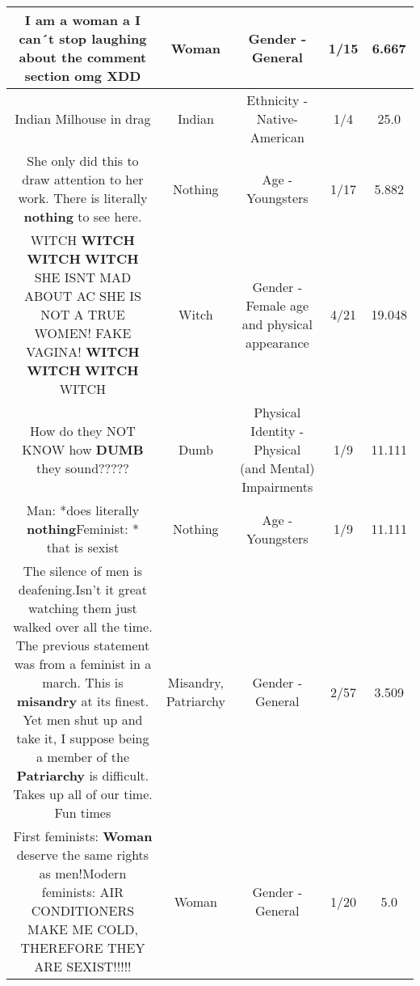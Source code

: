 \documentclass[11pt]{article}
\newlength\mylength
\begin{document}
\begin{center}
\begin{longtable}{|C{.65\mylength}|C{.30\mylength}|C{.12\mylength}|C{.12\mylength}|C{.12\mylength}|}
  \small I am a \textbf{woman} a I can´t stop laughing about the comment section omg XDD\normalsize   & Woman & Gender - General & 1/15 & 6.667 \\  \hline
  \small Indian Milhouse in drag\normalsize   & Indian & Ethnicity - Native-American & 1/4 & 25.0 \\  \hline
  \small She only did this to draw attention to her work. There is literally \textbf{nothing} to see here.\normalsize   & Nothing & Age - Youngsters & 1/17 & 5.882 \\  \hline
  \small WITCH \textbf{WITCH} \textbf{WITCH} \textbf{WITCH} SHE ISNT MAD ABOUT AC SHE IS NOT A TRUE WOMEN! FAKE VAGINA! \textbf{WITCH} \textbf{WITCH} \textbf{WITCH} WITCH\normalsize   & Witch & Gender - Female age and physical appearance & 4/21 & 19.048 \\  \hline
  \small How do they NOT KNOW how \textbf{DUMB} they sound?????\normalsize   & Dumb & Physical Identity - Physical (and Mental) Impairments & 1/9 & 11.111 \\  \hline
  \small Man: *does literally \textbf{nothing}Feminist: * that is sexist\normalsize   & Nothing & Age - Youngsters & 1/9 & 11.111 \\  \hline
  \small The silence of men is deafening.Isn't it great watching them just walked over all the time. The previous statement was from a feminist in a march. This is \textbf{misandry} at its finest. Yet men shut up and take it, I suppose being  a member of the \textbf{Patriarchy} is difficult. Takes up all of our time. Fun times\normalsize   & Misandry, Patriarchy & Gender - General & 2/57 & 3.509 \\  \hline
  \small First feminists: \textbf{Woman} deserve the same rights as men!Modern feminists: AIR CONDITIONERS MAKE ME COLD, THEREFORE THEY ARE SEXIST!!!!!\normalsize   & Woman & Gender - General & 1/20 & 5.0 \\  \hline

\end{longtable}
\end{center}
\end{document}
